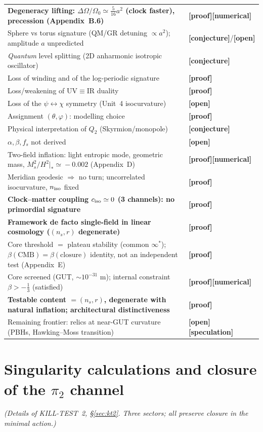 \documentclass[11pt]{article}
\newcommand{\preuve}{{\small\textbf{[proof]}}}
\newcommand{\num}{{\small\textbf{[numerical]}}}
\newcommand{\conj}{{\small\textbf{[conjecture]}}}
\newcommand{\spec}{{\small\textbf{[speculation]}}}
\newcommand{\ouv}{{\small\textbf{[open]}}}
\theoremstyle{definition}
\begin{document}
\begin{center}
\begin{tabular}{p{11.0cm} l}
\textbf{Degeneracy lifting: $\Delta\Omega/\Omega_0\simeq\tfrac{5}{16}a^2$ (clock faster), precession (Appendix~B.6)} & \preuve\num\\
Sphere vs torus signature (QM/GR detuning $\propto a^2$); amplitude $a$ unpredicted & \conj/\ouv\\
\emph{Quantum} level splitting (2D anharmonic isotropic oscillator) & \conj\\
Loss of winding and of the log-periodic signature & \preuve\\
Loss/weakening of UV$\equiv$IR duality & \preuve\\
Loss of the $\psi\!\leftrightarrow\!\chi$ symmetry (Unit~4 isocurvature) & \ouv\\
Assignment $(\theta,\varphi)$: modelling choice & \preuve\\
Physical interpretation of $Q_2$ (Skyrmion/monopole) & \conj\\
$\alpha,\beta,f_s$ not derived & \ouv\\
\midrule
Two-field inflation: light entropic mode, geometric mass, $M_s^2/H^2|_*\!\simeq\!-0.002$ (Appendix~D) & \preuve\num\\
Meridian geodesic $\Rightarrow$ no turn; uncorrelated isocurvature, $n_{\rm iso}$ fixed & \preuve\\
\textbf{Clock--matter coupling $c_{\rm iso}\simeq0$ (3 channels): no primordial signature} & \preuve\\
\textbf{Framework de facto single-field in linear cosmology ($(n_s,r)$ degenerate)} & \preuve\\
Core threshold $=$ plateau stability (common $\infty^\ast$); $\beta(\text{CMB}){=}\beta(\text{closure})$ identity, not an independent test (Appendix~E) & \preuve\\
Core screened (GUT, $\sim10^{-31}$ m); internal constraint $\beta>-\tfrac13$ (satisfied) & \preuve\num\\
\textbf{Testable content $=(n_s,r)$, degenerate with natural inflation; architectural distinctiveness} & \preuve\\
Remaining frontier: relics at near-GUT curvature (PBHs, Hawking--Moss transition) & \ouv\,\spec\\
\bottomrule
\end{tabular}
\end{center}

\appendix
\renewcommand{\thesection}{\Alph{section}}

\section{Singularity calculations and closure of the $\pi_2$ channel}\label{ann:A}
\emph{(Details of KILL-TEST~2, \S\ref{sec:kt2}. Three sectors; all preserve closure in the minimal
action.)}
\end{document}
